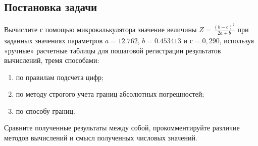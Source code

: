 \documentclass[a4paper, 14pt, fleqn]{extarticle}
\begin{document}
		\subsection{Постановка задачи}
			\noindent Вычислите с помощью микрокалькулятора значение величины \( Z = \frac{(b-c)^2}{2a+b} \) при заданных значениях параметров \(a = 12.762\), \(b = 0.453413\) и \(с = 0,290\), 
					используя «ручные» расчетные таблицы для пошаговой регистрации результатов вычислений, тремя способами:
					\begin{enumerate}
						\item по правилам подсчета цифр;
						\item по методу строгого учета границ абсолютных погрешностей;
						\item по способу границ.
					\end{enumerate}
					Сравните полученные результаты между собой, прокомментируйте различие методов вычислений и смысл
					полученных числовых значений.
\end{document}
